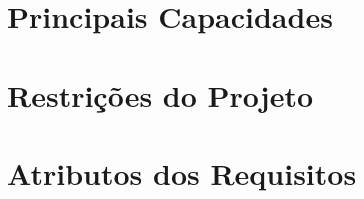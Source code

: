 \begin{apendicesenv}
\begin{itemize}
\end{itemize}




{\large {\section { Principais Capacidades\\ } } }

{\large {\section { Restrições do Projeto\\ } } }

{\large {\section { Atributos dos Requisitos\\ } } }


\end{apendicesenv}
